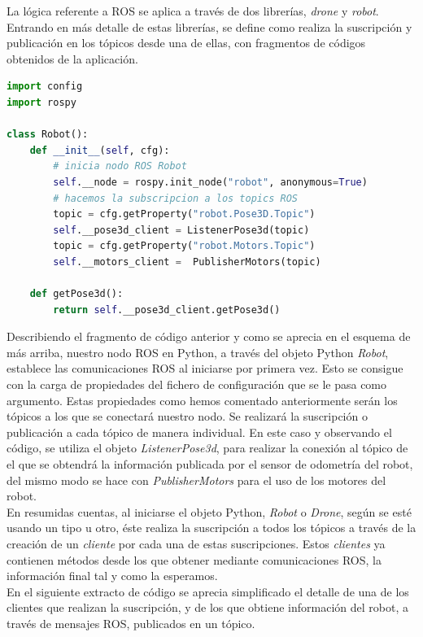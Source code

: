 La lógica referente a ROS se aplica a través de dos librerías, \textit{drone} y \textit{robot}. Entrando en más detalle de estas librerías, se define como realiza la suscripción y publicación en los tópicos desde una de ellas, con fragmentos de códigos obtenidos de la aplicación.\\

\begin{lstlisting}[language=python,firstnumber=1]
import config
import rospy

class Robot():
    def __init__(self, cfg):
        # inicia nodo ROS Robot
        self.__node = rospy.init_node("robot", anonymous=True)
        # hacemos la subscripcion a los topics ROS
        topic = cfg.getProperty("robot.Pose3D.Topic")
        self.__pose3d_client = ListenerPose3d(topic)
        topic = cfg.getProperty("robot.Motors.Topic")
        self.__motors_client =  PublisherMotors(topic)
        
	def getPose3d():
		return self.__pose3d_client.getPose3d()
\end{lstlisting}

Describiendo el fragmento de código anterior y como se aprecia en el esquema de más arriba, nuestro nodo ROS en Python, a través del objeto Python \textit{Robot}, establece las comunicaciones ROS al iniciarse por primera vez. Esto se consigue con la carga de propiedades del fichero de configuración que se le pasa como argumento. Estas propiedades como hemos comentado anteriormente serán los tópicos a los que se conectará nuestro nodo. Se realizará la suscripción o publicación a cada tópico de manera individual. En este caso y observando el código,  se utiliza el objeto \textit{ListenerPose3d}, para realizar la conexión al tópico de el que se obtendrá la información publicada por el sensor de odometría del robot, del mismo modo se hace con \textit{PublisherMotors} para el uso de los motores del robot.\\

En resumidas cuentas, al iniciarse el objeto Python, \textit{Robot} o \textit{Drone}, según se esté usando un tipo u otro, éste realiza la suscripción a todos los tópicos a través de la creación de un \textit{cliente} por cada una de estas suscripciones. Estos \textit{clientes} ya contienen métodos desde los que obtener mediante comunicaciones ROS, la información final tal y como la esperamos.\\

En el siguiente extracto de código se aprecia simplificado el detalle de una de los clientes que realizan la suscripción, y de los que obtiene información del robot, a través de mensajes ROS, publicados en un tópico.

